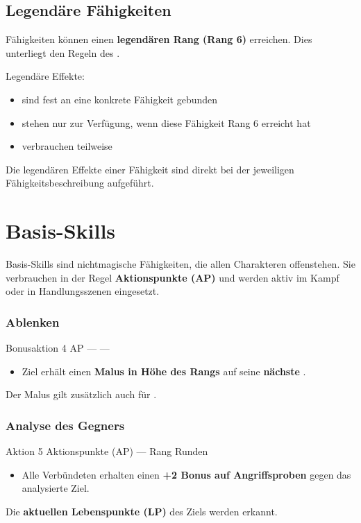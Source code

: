 \subsection*{Legendäre Fähigkeiten}

Fähigkeiten können einen \textbf{legendären Rang (Rang 6)} erreichen.
Dies unterliegt den Regeln des .

Legendäre Effekte:
\begin{itemize}
	\item sind fest an eine konkrete Fähigkeit gebunden
	\item stehen nur zur Verfügung, wenn diese Fähigkeit Rang 6 erreicht hat
	\item verbrauchen teilweise 
\end{itemize}

Die legendären Effekte einer Fähigkeit sind direkt bei der jeweiligen
Fähigkeitsbeschreibung aufgeführt.


\section{Basis-Skills}

Basis-Skills sind nichtmagische Fähigkeiten, die allen Charakteren offenstehen.
Sie verbrauchen in der Regel \textbf{Aktionspunkte (AP)} und werden aktiv
im Kampf oder in Handlungsszenen eingesetzt.

\subsubsection*{Ablenken}
\skillcard
{}
{Bonusaktion}
{4 AP}
{—}
{—}
{
	\begin{itemize}
		\item Ziel erhält einen \textbf{Malus in Höhe des Rangs} auf seine \textbf{nächste }.
	\end{itemize}
}
{
	Der Malus gilt zusätzlich auch für \textbf{}.
}


\subsubsection*{Analyse des Gegners}

\skillcard
{}
{Aktion}
{5 Aktionspunkte (AP)}
{—}
{Rang Runden}
{
	\begin{itemize}
		\item Alle Verbündeten erhalten einen \textbf{+2 Bonus auf Angriffsproben}
		gegen das analysierte Ziel.
	\end{itemize}
}
{
	Die \textbf{aktuellen Lebenspunkte (LP)} des Ziels werden erkannt.
}


